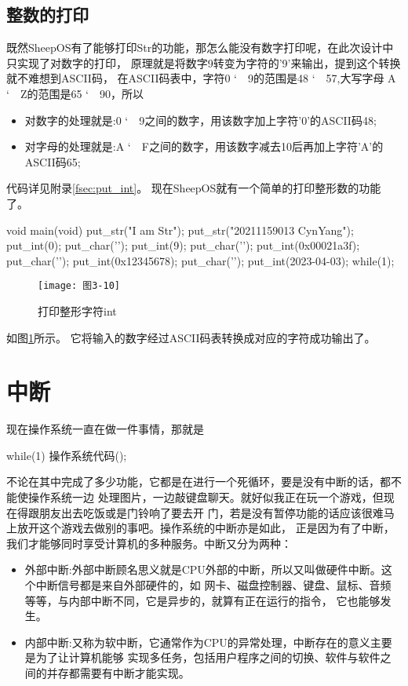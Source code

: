 \subsection{整数的打印}
\label{subsec:int}
既然SheepOS有了能够打印Str的功能，那怎么能没有数字打印呢，在此次设计中只实现了对数字的打印，
原理就是将数字9转变为字符的'9'来输出，提到这个转换就不难想到ASCII码，
在ASCII码表中，字符0 \char`~\, 9的范围是48 \char`~\, 57,大写字母
A \char`~\, Z的范围是65 \char`~\, 90，所以
\begin{itemize}
\item 对数字的处理就是:0 \char`~\, 9之间的数字，用该数字加上字符'0'的ASCII码48;
\item 对字母的处理就是:A \char`~\, F之间的数字，用该数字减去10后再加上字符'A'的ASCII码65;
\end{itemize}
代码详见附录\ref{fsec:put_int}。
现在SheepOS就有一个简单的打印整形数的功能了。

\begin{ccode}
void main(void)
{
   put_str("I am Str\n");
   put_str("20211159013 CynYang\n");
   put_int(0);
   put_char('\n');
   put_int(9);
   put_char('\n');
   put_int(0x00021a3f);
   put_char('\n');
   put_int(0x12345678);
   put_char('\n');
   put_int(2023-04-03);
   while(1);
}
\end{ccode}

\begin{figure}[H]
  \centering
  \texttt{[image: 图3-10]}
  \caption{打印整形字符int}
  \label{fig:print_int}
\end{figure}
如图\ref{fig:print_int}所示。
它将输入的数字经过ASCII码表转换成对应的字符成功输出了。

\section{中断}
\label{sec:interrupt}

现在操作系统一直在做一件事情，那就是
\begin{codeblock}
\begin{ccode}
while(1)
{
  操作系统代码();
}
\end{ccode}  
\end{codeblock}
不论在其中完成了多少功能，它都是在进行一个死循环，要是没有中断的话，都不能使操作系统一边
处理图片，一边敲键盘聊天。就好似我正在玩一个游戏，但现在得跟朋友出去吃饭或是门铃响了要去开
门，若是没有暂停功能的话应该很难马上放开这个游戏去做别的事吧。操作系统的中断亦是如此，
正是因为有了中断，我们才能够同时享受计算机的多种服务。中断又分为两种：
\begin{itemize}
\item 外部中断:外部中断顾名思义就是CPU外部的中断，所以又叫做硬件中断。这个中断信号都是来自外部硬件的，如
网卡、磁盘控制器、键盘、鼠标、音频等等，与内部中断不同，它是异步的，就算有正在运行的指令，
它也能够发生。
\item 内部中断:又称为软中断，它通常作为CPU的异常处理，中断存在的意义主要是为了让计算机能够
  实现多任务，包括用户程序之间的切换、软件与软件之间的并存都需要有中断才能实现。
\end{itemize}

